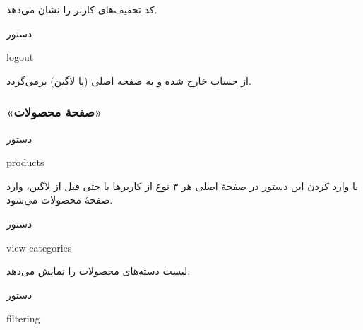 \documentclass[]{article}
\begin{document}
کد تخفیف‌های کاربر را نشان می‌دهد.

\hrulefill


\begin{mybox}[colback=yellow]{دستور}

\begin{latin}

logout

\end{latin}

\end{mybox}

از حساب خارج شده و به صفحه اصلی (یا لاگین) برمی‌گردد.


\newpage

\subsubsection*{{\titr «صفحهٔ محصولات»}}

\begin{mybox}[colback=yellow]{دستور}

\begin{latin}

products

\end{latin}

\end{mybox}


با وارد کردن این دستور در صفحهٔ اصلی هر ۳ نوع از کاربرها یا حتی قبل از لاگین، وارد صفحهٔ محصولات می‌شود.

\hrulefill

\begin{mybox}[colback=yellow]{دستور}

\begin{latin}

view categories

\end{latin}

\end{mybox}

لیست دسته‌های محصولات را نمایش می‌دهد.

\hrulefill


\begin{mybox}[colback=yellow]{دستور}

\begin{latin}

filtering

\end{latin}

\end{mybox}
\end{document}
